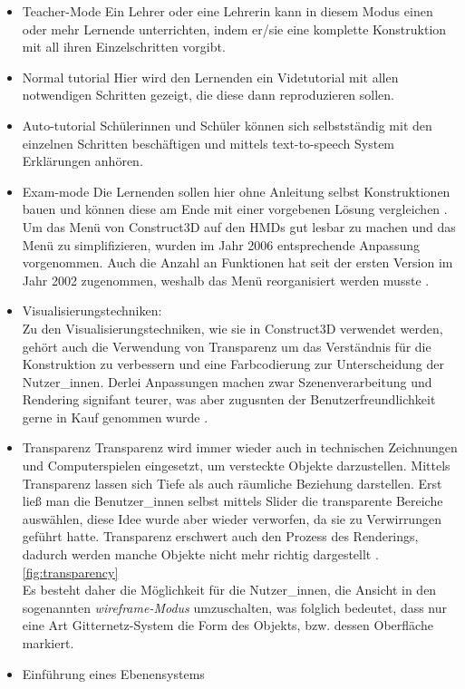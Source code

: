 \documentclass[deutsch]{llncs}
\begin{document}
\begin{itemize}
\item Teacher-Mode 
Ein Lehrer oder eine Lehrerin kann in diesem Modus einen oder mehr Lernende unterrichten, indem er/sie eine komplette Konstruktion mit all ihren Einzelschritten vorgibt. 
\item Normal tutorial
Hier wird den Lernenden ein Videtutorial mit allen notwendigen Schritten gezeigt, die diese dann reproduzieren sollen. 
\item Auto-tutorial 
Schülerinnen und Schüler können sich selbstständig mit den einzelnen Schritten beschäftigen und mittels text-to-speech System Erklärungen anhören. 
\item Exam-mode 
Die Lernenden sollen hier ohne Anleitung selbst Konstruktionen bauen und können diese am Ende mit einer vorgebenen Lösung vergleichen \cite{article}. 
Um das Menü von Construct3D auf den HMDs gut lesbar zu machen und das Menü zu simplifizieren, wurden im Jahr 2006 entsprechende Anpassung vorgenommen. Auch die Anzahl an Funktionen hat seit  der ersten Version im Jahr 2002 zugenommen, weshalb das Menü reorganisiert werden musste \cite{1667626}. 
\item Visualisierungstechniken: \\
Zu den Visualisierungstechniken, wie sie in Construct3D verwendet werden, gehört auch die Verwendung von Transparenz um das Verständnis für die Konstruktion zu verbessern und eine Farbcodierung zur Unterscheidung der Nutzer\_innen. Derlei Anpassungen machen zwar Szenenverarbeitung und Rendering signifant teurer, was aber zugusnten der Benutzerfreundlichkeit gerne in Kauf genommen wurde \cite{1667626}. 
\item Transparenz 
Transparenz wird  immer wieder auch in technischen Zeichnungen und Computerspielen eingesetzt, um versteckte Objekte darzustellen. Mittels Transparenz lassen sich Tiefe als auch räumliche Beziehung darstellen. Erst ließ man die Benutzer\_innen selbst mittels Slider die transparente Bereiche auswählen, diese Idee wurde aber wieder verworfen, da sie zu Verwirrungen geführt hatte. Transparenz erschwert auch den Prozess des Renderings, dadurch werden manche Objekte nicht mehr richtig dargestellt \cite{1667626}. 
\autoref{fig:transparency} \\
Es besteht daher die Möglichkeit für die Nutzer\_innen, die Ansicht in den sogenannten \emph{wireframe-Modus} umzuschalten, was folglich bedeutet, dass nur eine Art Gitternetz-System die Form des Objekts, bzw. dessen Oberfläche markiert.  
\item  Einführung eines Ebenensystems

\end{itemize}
\end{document}
